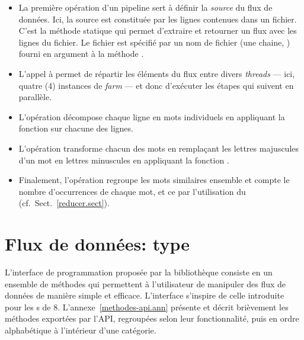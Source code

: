 \begin{itemize}

\item  La premi\`ere op\'eration d'un pipeline sert \`a d\'efinir la \emph{source} du flux de donn\'ees. Ici, la source est
constitu\'ee par les lignes contenues dans un fichier. C'est la
m\'ethode statique  qui permet d'extraire et retourner un
flux avec les lignes du fichier. Le fichier est sp\'ecifi\'e par un nom de fichier
(une chaine, ) fourni en argument \`a la m\'ethode
.


\item L'appel \`a  permet de r\'epartir les \'el\'ements du flux entre divers \emph{threads} --- ici, quatre (4) instances de \emph{farm} --- et donc d'ex\'ecuter les \'etapes qui suivent en parall\`ele. 



\item L'op\'eration  d\'ecompose chaque ligne en mots individuels en appliquant la fonction  sur chacune des lignes.

\item L'op\'eration  transforme chacun des mots en rempla\c{c}ant les lettres majuscules d'un mot en lettres minuscules en appliquant la fonction .

\item Finalement, l'op\'eration   regroupe les mots similaires ensemble et compte le nombre d'occurrences de chaque mot, et ce par l'utilisation du  (cf.~Sect.~\ref{reducer.sect}).
\end{itemize}


\section{Flux de donn\'ees: type }
\label{flow.sect}

L'interface de programmation propos\'ee par la bibliothèque  consiste en un ensemble de m\'ethodes qui permettent \`a l'utilisateur de manipuler des flux de donn\'ees de mani\`ere simple et efficace. L'interface s'inspire de celle introduite pour les s de  8. L'annexe~\ref{methodes-api.ann} présente et d\'ecrit bri\`evement les m\'ethodes export\'ees par l'API, regroup\'ees selon leur fonctionnalit\'e, puis en ordre alphab\'etique \`a l'int\'erieur d'une cat\'egorie.




